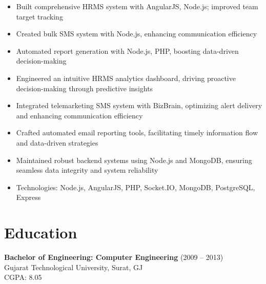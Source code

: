 \documentclass[10pt,a4paper]{article}
\begin{document}
\begin{itemize}[leftmargin=*, nosep]
  \item Built comprehensive HRMS system with AngularJS, Node.js; improved team target tracking
  \item Created bulk SMS system with Node.js, enhancing communication efficiency
  \item Automated report generation with Node.js, PHP, boosting data-driven decision-making
  \item Engineered an intuitive HRMS analytics dashboard, driving proactive decision-making through predictive insights
  \item Integrated telemarketing SMS system with BizBrain, optimizing alert delivery and enhancing communication efficiency
  \item Crafted automated email reporting tools, facilitating timely information flow and data-driven strategies
  \item Maintained robust backend systems using Node.js and MongoDB, ensuring seamless data integrity and system reliability
  \item Technologies: Node.js, AngularJS, PHP, Socket.IO, MongoDB, PostgreSQL, Express
\end{itemize}

\section*{Education}
\textbf{Bachelor of Engineering: Computer Engineering} (2009 -- 2013) \\
Gujarat Technological University, Surat, GJ \\
CGPA: 8.05
\end{document}
